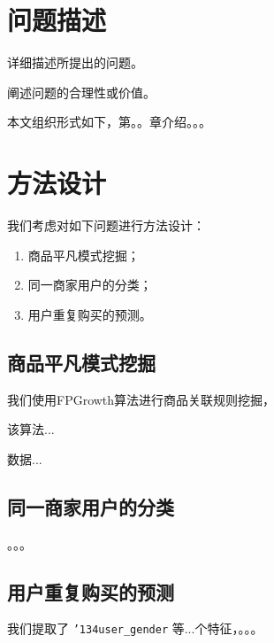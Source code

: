 \documentclass{acm_proc_article-sp}
\newcommand{\zap}[1]{}
\newcommand\TODO[1]{{\color{red}{Todo: #1}}}
\begin{document}
\begin{spacing}{1.2}
\zap{
\category{H.4}{Information Systems Applications}{Miscellaneous}
\category{D.2.8}{Software Engineering}{Metrics}[complexity measures, performance measures]
}



\section{问题描述} %
详细描述所提出的问题。

阐述问题的合理性或价值。

本文组织形式如下，第。。章介绍。。。

\section{方法设计}
我们考虑对如下问题进行方法设计：
\begin{enumerate}
  \item 商品平凡模式挖掘；
  \item 同一商家用户的分类；
  \item 用户重复购买的预测。
\end{enumerate}

\TODO{实验环境}

\subsection{商品平凡模式挖掘}
我们使用FPGrowth算法进行商品关联规则挖掘，

该算法...\TODO{算法review}

数据...\TODO{描述使用到的数据}

\subsection{同一商家用户的分类}
。。。

\subsection{用户重复购买的预测}
我们提取了 \texttt{{\char'134}user\_gender} 等...个特征，。。。

\TODO{特征工程}

\TODO{算法框架}

\TODO{模型、融合}


\end{spacing}
\end{document}
